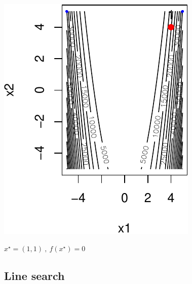 \documentclass[12pt]{beamer}
\begin{document}
\begin{frame}
\begin{center}
\begin{minipage}[b]{0.3\textwidth}
\includegraphics[width=\textwidth]{gradient_rosen_alpha0.1_x_diverges-crop.pdf} 
\end{minipage}
$x^\star = (1,1) ~,~ f(x^\star) = 0$
\end{center}
\end{frame}

\subsection{Line search}
\end{document}
